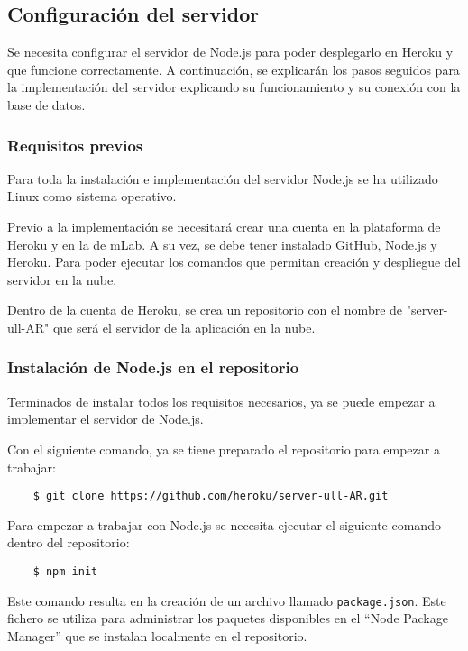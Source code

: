 \subsection{Configuración del servidor}

Se necesita configurar el servidor de Node.js para poder desplegarlo en Heroku y que funcione correctamente. A continuación, se explicarán los pasos seguidos para la implementación del servidor explicando su funcionamiento y su conexión con la base de datos.

\subsubsection{Requisitos previos}
Para toda la instalación e implementación del servidor Node.js se ha utilizado Linux como sistema operativo.

Previo a la implementación se necesitará crear una cuenta en la plataforma de Heroku y en la de mLab. A su vez, se debe tener instalado GitHub, Node.js y Heroku. Para poder ejecutar los comandos que permitan creación y despliegue del servidor en la nube.

Dentro de la cuenta de Heroku, se crea un repositorio con el nombre de "server-ull-AR" que será el servidor de la aplicación en la nube.

\subsubsection{Instalación de Node.js en el repositorio}

Terminados de instalar todos los requisitos necesarios, ya se puede empezar a implementar el servidor de Node.js.

Con el siguiente comando, ya se tiene preparado el repositorio para empezar a trabajar:

\begin{lstlisting}
    $ git clone https://github.com/heroku/server-ull-AR.git
\end{lstlisting}

Para empezar a trabajar con Node.js se necesita ejecutar el siguiente comando dentro del repositorio:

\begin{lstlisting}
    $ npm init 
\end{lstlisting}

Este comando resulta en la creación de un archivo llamado \texttt{package.json}. Este fichero se utiliza para administrar los paquetes disponibles en el ``Node Package Manager'' que se instalan localmente en el repositorio.

